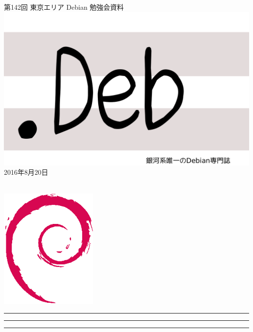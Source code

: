 \documentclass[mingoth,a4paper]{jsarticle}
\newcommand{\debmtgyear}{2016}
\newcommand{\debmtgmonth}{8}
\newcommand{\debmtgdate}{20}
\newcommand{\debmtgnumber}{142}
\begin{document}
\begin{titlepage}
\thispagestyle{empty}

\vspace*{-2cm}
第\debmtgnumber{}回 東京エリア Debian 勉強会資料\\
\hspace*{-2cm}
\includegraphics{image2012-natsu/dotdeb.pdf}\\
\hfill{}\debmtgyear{}年\debmtgmonth{}月\debmtgdate{}日

\\

\vspace*{-2cm}
\hfill{}\includegraphics[height=6cm]{image200502/openlogo-nd.eps}
\end{titlepage}

\newpage

\begin{minipage}[b]{0.2\hsize}
 \colorbox{titleback}{}
\end{minipage}
\begin{minipage}[b]{0.8\hsize}
\hrule
\vspace{2mm}
\hrule
\begin{multicols}{2}
\tableofcontents
\end{multicols}
\vspace{2mm}
\hrule
\end{minipage}
\end{document}
